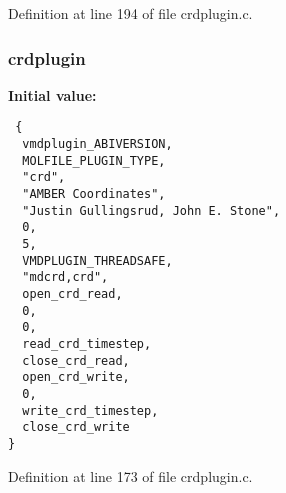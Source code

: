 Definition at line 194 of file crdplugin.c.
\subsubsection{ crdplugin\hspace{0.3cm}{\tt  [static]}}\label{crdplugin_8c_a0}


{\bf Initial value:}

\footnotesize\begin{verbatim} {
  vmdplugin_ABIVERSION,                         
  MOLFILE_PLUGIN_TYPE,                          
  "crd",                                        
  "AMBER Coordinates",                          
  "Justin Gullingsrud, John E. Stone",          
  0,                                            
  5,                                            
  VMDPLUGIN_THREADSAFE,                         
  "mdcrd,crd",                                  
  open_crd_read,
  0,
  0,
  read_crd_timestep,
  close_crd_read,
  open_crd_write,
  0,
  write_crd_timestep,
  close_crd_write
}\end{verbatim}\normalsize 


Definition at line 173 of file crdplugin.c.